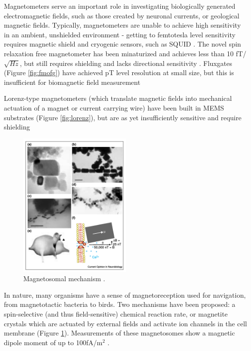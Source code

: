 Magnetometers serve an important role in investigating biologically generated electromagnetic fields, such as those created by neuronal currents, or geological magnetic fields. Typically, magnetometers are unable to achieve high sensitivity in an ambient, unshielded environment - getting to femtotesla level sensitivity requires magnetic shield and cryogenic sensors, such as SQUID \cite{lenz2006magnetic}. The novel spin relaxation free magnetometer has been minaturized and achieves less than 10 fT/$\sqrt{Hz}$, but still requires shielding and lacks directional sensitivity \cite{shah2013compact}. Fluxgates (Figure \ref{fig:fmofg}) have achieved pT level resolution at small size, but this is insufficient for biomagnetic field measurement \cite{sasada2002orthogonal,uchiyama2014highly,sasada2014fundamental} 

Lorenz-type magnetometers (which translate magnetic fields into mechanical actuation of a magnet or current carrying wire) have been built in MEMS substrates (Figure \ref{fig:lorenz}), but are as yet insufficiently sensitive and require shielding \cite{sinha201627,kyynarainen20083d,kumar2015ultra,thompson2009parametrically}

\begin{figure}
\centering
\includegraphics[width=0.5\textwidth]{kirsh2001}
\caption{Magnetosomal mechanism \cite{kirschvink2001magnetite}.}
\label{fig:magnetosome}
\end{figure}

In nature, many organisms have a sense of magnetoreception used for navigation, from magnetotactic bacteria to birds. Two mechanisms have been proposed: a spin-selective (and thus field-sensitive) chemical reaction rate, or magnetite crystals which are actuated by external fields and activate ion channels in the cell membrane (Figure \ref{fig:magnetosome})\cite{johnsen2005physics,dodson2013radical,kirschvink2001magnetite}. Measurements of these magnetosomes show a magnetic dipole moment of up to 100fA/m$^2$ \cite{hanzlik2002pulsed,eder2012magnetic}.

